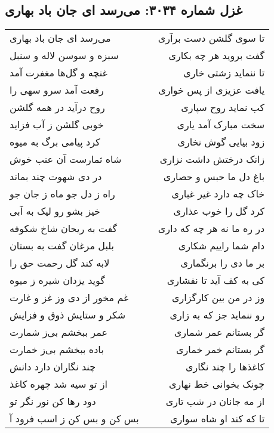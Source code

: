 \begin{center}
\section*{غزل شماره ۳۰۳۴: می‌رسد ای جان باد بهاری}
\label{sec:3034}
\begin{longtable}{l p{0.5cm} r}
می‌رسد ای جان باد بهاری
&&
تا سوی گلشن دست برآری
\\
سبزه و سوسن لاله و سنبل
&&
گفت بروید هر چه بکاری
\\
غنچه و گل‌ها مغفرت آمد
&&
تا ننماید زشتی خاری
\\
رفعت آمد سرو سهی را
&&
یافت عزیزی از پس خواری
\\
روح درآید در همه گلشن
&&
کب نماید روح سپاری
\\
خوبی گلشن ز آب فزاید
&&
سخت مبارک آمد یاری
\\
کرد پیامی برگ به میوه
&&
زود بیایی گوش نخاری
\\
شاه ثمارست آن عنب خوش
&&
زانک درختش داشت نزاری
\\
در دی شهوت چند بماند
&&
باغ دل ما حبس و حصاری
\\
راه ز دل جو ماه ز جان جو
&&
خاک چه دارد غیر غباری
\\
خیز بشو رو لیک به آبی
&&
کرد گل را خوب عذاری
\\
گفت به ریحان شاخ شکوفه
&&
در ره ما نه هر چه که داری
\\
بلبل مرغان گفت به بستان
&&
دام شما راییم شکاری
\\
لابه کند گل رحمت حق را
&&
بر ما دی را برنگماری
\\
گوید یزدان شیره ز میوه
&&
کی به کف آید تا نفشاری
\\
غم مخور از دی وز غز و غارت
&&
وز در من بین کارگزاری
\\
شکر و ستایش ذوق و فزایش
&&
رو ننماید جز که به زاری
\\
عمر ببخشم بی‌ز شمارت
&&
گر بستانم عمر شماری
\\
باده ببخشم بی‌ز خمارت
&&
گر بستانم خمر خماری
\\
چند نگاران دارد دانش
&&
کاغذها را چند نگاری
\\
از تو سیه شد چهره کاغذ
&&
چونک بخوانی خط نهاری
\\
دود رها کن نور نگر تو
&&
از مه جانان در شب تاری
\\
بس کن و بس کن ز اسب فرود آ
&&
تا که کند او شاه سواری
\\
\end{longtable}
\end{center}
